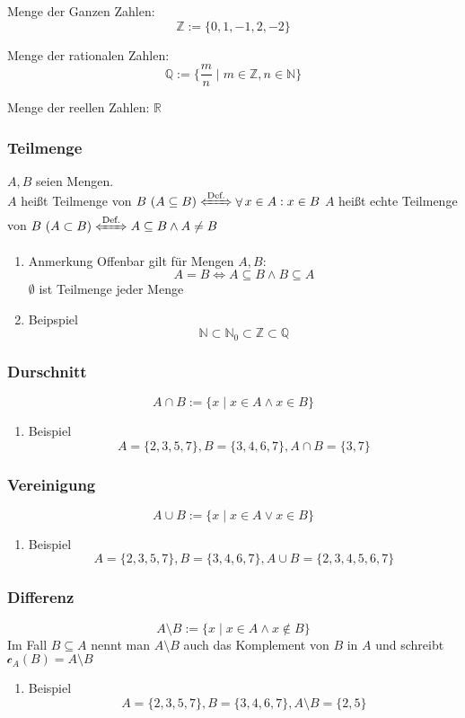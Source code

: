 \documentclass[11pt]{article}
\DeclareMathOperator{\Forall}{\forall}
\begin{document}
Menge der Ganzen Zahlen:
\[\mathbb{Z} := \{0,1,-1,2,-2\}\]

Menge der rationalen Zahlen:
\[\mathbb{Q} := \{\frac{m}{n} \mid m\in\mathbb{Z}, n\in\mathbb{N}\}\]

Menge der reellen Zahlen: $\mathbb{R}$

\subsubsection{Teilmenge}
\label{sec-2-4-5}
$A,B$ seien Mengen. \\
    $A$ heißt Teilmenge von $B~(A\subseteq B) \xLeftrightarrow{\text{Def.}} \Forall x\in A: x\in B$
$A$ heißt echte Teilmenge von $B~(A\subset B) \xLeftrightarrow{\text{Def.}} A\subseteq B \wedge A\neq B$
\begin{enumerate}
\item Anmerkung
\label{sec-2-4-5-1}
Offenbar gilt für Mengen $A,B$:
\[A=B \Leftrightarrow A\subseteq B \wedge B\subseteq A\]
$\emptyset$ ist Teilmenge jeder Menge

\item Beipspiel
\label{sec-2-4-5-2}
\[\mathbb{N}\subset\mathbb{N}_0\subset\mathbb{Z}\subset\mathbb{Q}\]
\end{enumerate}

\subsubsection{Durschnitt}
\label{sec-2-4-6}
\[A \cap B := \{x\mid x\in A \wedge x\in B\}\]
\begin{enumerate}
\item Beispiel
\label{sec-2-4-6-1}
\[A=\{2,3,5,7\}, B=\{3,4,6,7\}, A\cap B = \{3,7\}\]
\end{enumerate}

\subsubsection{Vereinigung}
\label{sec-2-4-7}
\[A\cup B := \{x\mid x\in A \vee x\in B\}\]
\begin{enumerate}
\item Beispiel
\label{sec-2-4-7-1}
\[A=\{2,3,5,7\}, B=\{3,4,6,7\}, A\cup B = \{2,3,4,5,6,7\}\]
\end{enumerate}

\subsubsection{Differenz}
\label{sec-2-4-8}
\[A\setminus B := \{x\mid x\in A \wedge x\not\in B\}\]
Im Fall $B\subseteq A$ nennt man $A\setminus B$ auch das Komplement von $B$ in $A$ und schreibt $\mathcal{c}_A(B) = A\setminus B$
\begin{enumerate}
\item Beispiel
\label{sec-2-4-8-1}
\[A=\{2,3,5,7\}, B=\{3,4,6,7\}, A\setminus B = \{2,5\}\]
\end{enumerate}
\end{document}

